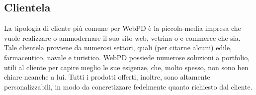 \subsection{Clientela}
La tipologia di cliente più comune per WebPD è la piccola-media impresa che vuole realizzare o ammodernare il suo sito web, vetrina o e-commerce che sia. Tale clientela proviene da numerosi settori, quali (per citarne alcuni) edile, farmaceutico, navale e turistico. WebPD possiede numerose soluzioni a portfolio, utili al cliente per capire meglio le sue esigenze, che, molto spesso, non sono ben chiare neanche a lui. Tutti i prodotti offerti, inoltre, sono altamente personalizzabili, in modo da concretizzare fedelmente quanto richiesto dal cliente.